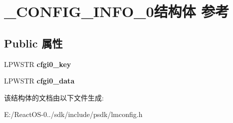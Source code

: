 \hypertarget{struct___c_o_n_f_i_g___i_n_f_o__0}{}\section{\+\_\+\+C\+O\+N\+F\+I\+G\+\_\+\+I\+N\+F\+O\+\_\+0结构体 参考}
\label{struct___c_o_n_f_i_g___i_n_f_o__0}
\subsection*{Public 属性}
\begin{DoxyCompactItemize}
\item 
\mbox{\label{struct___c_o_n_f_i_g___i_n_f_o__0_af9350ab1f180fa23ec87cc9c78b48be2}} 
L\+P\+W\+S\+TR {\bfseries cfgi0\+\_\+key}
\item 
\mbox{\label{struct___c_o_n_f_i_g___i_n_f_o__0_a2d6fb2431f855e75122f58b0f27a6760}} 
L\+P\+W\+S\+TR {\bfseries cfgi0\+\_\+data}
\end{DoxyCompactItemize}


该结构体的文档由以下文件生成\+:\begin{DoxyCompactItemize}
\item 
E\+:/\+React\+O\+S-\/0../sdk/include/psdk/lmconfig.\+h\end{DoxyCompactItemize}
